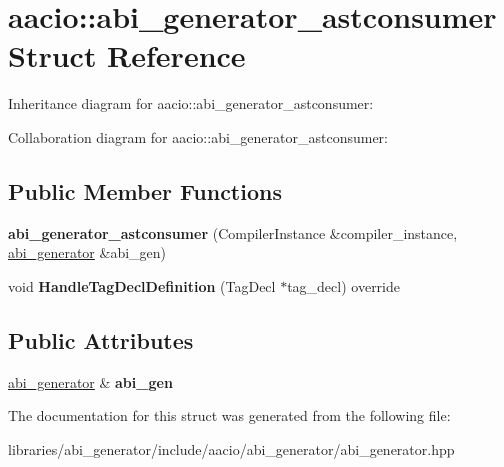 \hypertarget{structaacio_1_1abi__generator__astconsumer}{}\section{aacio\+:\+:abi\+\_\+generator\+\_\+astconsumer Struct Reference}
\label{structaacio_1_1abi__generator__astconsumer}


Inheritance diagram for aacio\+:\+:abi\+\_\+generator\+\_\+astconsumer\+:


Collaboration diagram for aacio\+:\+:abi\+\_\+generator\+\_\+astconsumer\+:
\subsection*{Public Member Functions}
\begin{DoxyCompactItemize}
\item 
\mbox{\label{structaacio_1_1abi__generator__astconsumer_a1080ac6d167a2071ecbfa26960eddf4e}} 
{\bfseries abi\+\_\+generator\+\_\+astconsumer} (Compiler\+Instance \&compiler\+\_\+instance, \mbox{\hyperlink{classaacio_1_1abi__generator}{abi\+\_\+generator}} \&abi\+\_\+gen)
\item 
\mbox{\label{structaacio_1_1abi__generator__astconsumer_aeb017d48022c31949cc910107a12bf51}} 
void {\bfseries Handle\+Tag\+Decl\+Definition} (Tag\+Decl $\ast$tag\+\_\+decl) override
\end{DoxyCompactItemize}
\subsection*{Public Attributes}
\begin{DoxyCompactItemize}
\item 
\mbox{\label{structaacio_1_1abi__generator__astconsumer_af8950e7adaa88aa3868c35877e4afb4b}} 
\mbox{\hyperlink{classaacio_1_1abi__generator}{abi\+\_\+generator}} \& {\bfseries abi\+\_\+gen}
\end{DoxyCompactItemize}


The documentation for this struct was generated from the following file\+:\begin{DoxyCompactItemize}
\item 
libraries/abi\+\_\+generator/include/aacio/abi\+\_\+generator/abi\+\_\+generator.\+hpp\end{DoxyCompactItemize}

